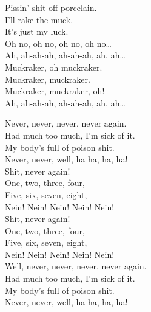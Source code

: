 Pissin' shit off porcelain. \\
I'll rake the muck. \\
It's just my luck. \\

Oh no, oh no, oh no, oh no… \\

Ah, ah-ah-ah, ah-ah-ah, ah, ah… \\
Muckraker, oh muckraker. \\
Muckraker, muckraker. \\
Muckraker, muckraker, oh! \\

Ah, ah-ah-ah, ah-ah-ah, ah, ah… \\




Never, never, never, never again. \\
Had much too much, I'm sick of it. \\
My body's full of poison shit. \\
Never, never, well, ha ha, ha, ha! \\

Shit, never again! \\

One, two, three, four, \\
Five, six, seven, eight, \\
Nein! Nein! Nein! Nein! Nein! \\

Shit, never again! \\

One, two, three, four, \\
Five, six, seven, eight, \\
Nein! Nein! Nein! Nein! Nein! \\

Well, never, never, never, never again. \\
Had much too much, I'm sick of it. \\
My body's full of poison shit. \\
Never, never, well, ha ha, ha, ha! \\




